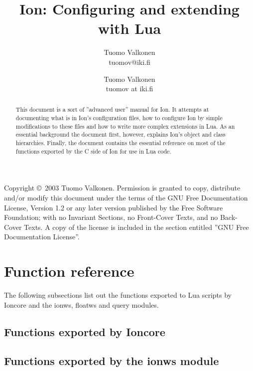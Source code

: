 \documentclass[english,a4paper,11pt,oldtoc,mctitle]{rapport3}
\title{Ion: Configuring and extending with Lua}
\author{Tuomo Valkonen \\ tuomov@iki.fi}
\author{Tuomo Valkonen \\ tuomov at iki.fi}
\begin{document}
\maketitle

Copyright \copyright\  2003 Tuomo Valkonen.
Permission is granted to copy, distribute and/or modify this document
under the terms of the GNU Free Documentation License, Version 1.2
or any later version published by the Free Software Foundation;
with no Invariant Sections, no Front-Cover Texts, and no Back-Cover Texts.
A copy of the license is included in the section entitled ''GNU
Free Documentation License''.

\begin{abstract}
    This document is a sort of ''advanced user'' manual for Ion. It
    attempts at documenting what is in Ion's configuration files,
    how to configure Ion by simple modifications to these files and
    how to write more complex extensions in Lua. As an essential 
    background the document first, however, explains Ion's object and
    class hierarchies. Finally, the document contains the essential
    reference on most of the functions exported by the C side of Ion
    for use in Lua code.
\end{abstract}

\tableofcontents









\chapter{Function reference}
\label{sec:exports}

The following subsections list out the functions exported to Lua scripts
by Ioncore and the ionws, floatws and query modules.

\section{Functions exported by Ioncore}
\label{sec:ioncoreref}



\section{Functions exported by the ionws module}
\label{sec:ionwsref}
\end{document}
